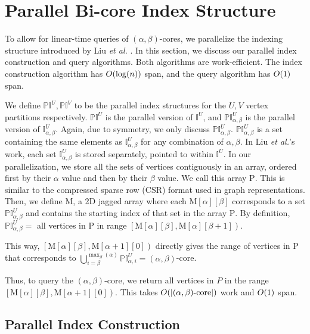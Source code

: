 \section{Parallel Bi-core Index Structure}\label{sec:parindex}

To allow for linear-time queries of $(\alpha,\beta)$-cores, we parallelize the indexing structure introduced by Liu \textit{et al.} \cite{Liu2020Efficient}. In this section, we discuss our parallel index construction and query algorithms. Both algorithms are work-efficient. The index construction algorithm has $O(\log(n))$ span, and the query algorithm has $O(1)$ span.

We define $\mathbb{PI}^U, \mathbb{PI}^V$ to be the parallel index structures for the $U, V$ vertex partitions respectively. $\mathbb{PI}^U$ is the parallel version of $\mathbb{I}^U$, and $\mathbb{PI}^U_{\alpha, \beta}$ is the parallel version of $\mathbb{I}^U_{\alpha, \beta}$. Again, due to symmetry, we only discuss $\mathbb{PI}^U_{\alpha,\beta}$. $\mathbb{PI}^U_{\alpha,\beta}$ is a set containing the same elements as $\mathbb{I}^U_{\alpha,\beta}$ for any combination of $\alpha, \beta$. %
In Liu \textit{et al.}'s work, each set $\mathbb{I}^U_{\alpha,\beta}$ is stored separately, pointed to within $\mathbb{I}^U$. In our parallelization, we store all the sets of vertices contiguously in an array, ordered first by their $\alpha$ value and then by their $\beta$ value. 
We call this array $\text{P}$. 
This is similar to the compressed sparse row (CSR) format used in graph representations. 
Then, we define $\text{M}$, a 2D jagged array where each $\text{M}[\alpha][\beta]$ corresponds to a set $\mathbb{PI}^U_{\alpha,\beta}$ and contains the starting index of that set in the array $\text{P}$. By definition, $\mathbb{PI}^U_{\alpha,\beta}=$ all vertices in $\text{P}$ in range $\left[\text{M}[\alpha][\beta], \text{M}[\alpha][\beta+1]\right)$. 

This way, $\left[\text{M}[\alpha][\beta], \text{M}[\alpha+1][0]\right)$ directly gives the range of vertices in $\text{P}$ that corresponds to $\bigcup_{i = \beta}^{\max_\beta(\alpha)} \mathbb{PI}^U_{\alpha,i} = (\alpha,\beta)$-core.

Thus, to query the $(\alpha,\beta)$-core, we return all vertices in $P$ in the range $\left[\text{M}[\alpha][\beta],\text{M}[\alpha+1][0]\right)$. This takes $O(|(\alpha,\beta)\text{-core}|)$ work and $O(1)$ span.


\subsection{Parallel Index Construction}

